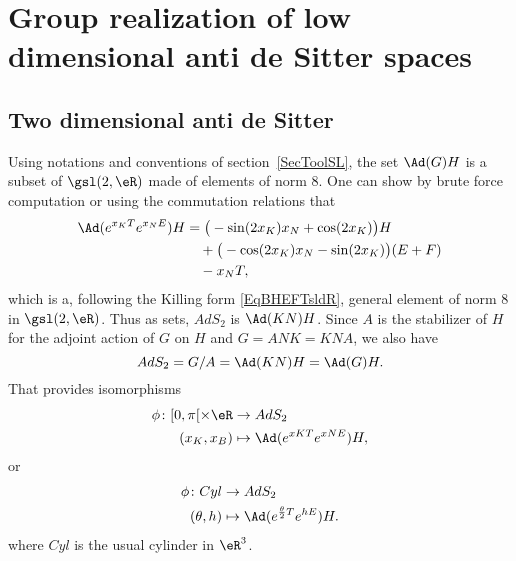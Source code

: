 

\section[Low dimensional anti de Sitter spaces]{Group realization of low dimensional anti de Sitter spaces}

\subsection{Two dimensional anti de Sitter}		\label{SubsecTwoDimAdSAdGH}

Using notations and conventions of section~\ref{SecToolSL}, the set $\Ad(G)H$ is a subset of $\gsl(2,\eR)$ made of elements of norm $8$. One can show by brute force computation or using the commutation relations that
\[
	\begin{split}
		\Ad( e^{x_KT} e^{x_NE})H&=\big( -\sin(2x_K)x_N+\cos(2x_K) \big)H\\
		&\quad+\big( -\cos(2x_K)x_N-\sin(2x_K) \big)(E+F)\\
		&\quad-x_NT,
	\end{split}
\]
which is a, following the Killing form \eqref{EqBHEFTsldR},  general element of norm $8$ in $\gsl(2,\eR)$. Thus as sets, $AdS_2$ is $\Ad(KN)H$.  Since $A$ is the stabilizer of $H$ for the adjoint action of $G$ on $H$ and $G=ANK=KNA$, we also have
\[
	AdS_2=G/A=\Ad(KN)H=\Ad(G)H.
\]
That provides isomorphisms
\begin{equation}
	\begin{aligned}
		\phi\colon [0,\pi[\times\eR & \to AdS_2                        \\
		(x_K,x_B)                   & \mapsto \Ad( e^{xK T} e^{xNE})H,
	\end{aligned}
\end{equation}
or
\begin{equation}	 \label{EqCylAdSDeux}
	\begin{aligned}
		\phi\colon Cyl & \to AdS_2                                        \\
		(\theta,h)     & \mapsto \Ad( e^{\frac{ \theta }{ 2 }T} e^{hE})H.
	\end{aligned}
\end{equation}
where $Cyl$ is the usual cylinder in $\eR^3$.


